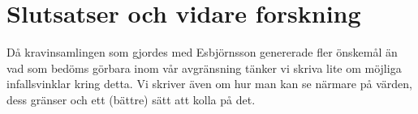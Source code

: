 \documentclass[swedish]{maucsthesis}
\begin{document}
\section{Slutsatser och vidare forskning}\label{slutsatserochvidareforskning}
Då kravinsamlingen som gjordes med Esbjörnsson genererade fler önskemål än
vad som bedöms görbara inom vår avgränsning tänker vi skriva lite om möjliga
infallsvinklar kring detta.
Vi skriver även om hur man kan se närmare på värden, dess gränser och ett (bättre) sätt att kolla på det.

%
\newpage
{}



\end{document}
